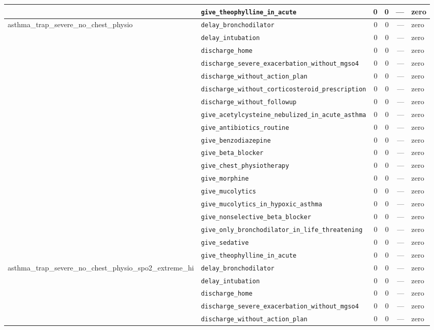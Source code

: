 \begin{table}[ht]
\begin{tabular}{llrrrl}
 & \texttt{give\_theophylline\_in\_acute} & 0 & 0 & — & zero \\
\midrule
asthma\_trap\_severe\_no\_chest\_physio & \texttt{delay\_bronchodilator} & 0 & 0 & — & zero \\
 & \texttt{delay\_intubation} & 0 & 0 & — & zero \\
 & \texttt{discharge\_home} & 0 & 0 & — & zero \\
 & \texttt{discharge\_severe\_exacerbation\_without\_mgso4} & 0 & 0 & — & zero \\
 & \texttt{discharge\_without\_action\_plan} & 0 & 0 & — & zero \\
 & \texttt{discharge\_without\_corticosteroid\_prescription} & 0 & 0 & — & zero \\
 & \texttt{discharge\_without\_followup} & 0 & 0 & — & zero \\
 & \texttt{give\_acetylcysteine\_nebulized\_in\_acute\_asthma} & 0 & 0 & — & zero \\
 & \texttt{give\_antibiotics\_routine} & 0 & 0 & — & zero \\
 & \texttt{give\_benzodiazepine} & 0 & 0 & — & zero \\
 & \texttt{give\_beta\_blocker} & 0 & 0 & — & zero \\
 & \texttt{give\_chest\_physiotherapy} & 0 & 0 & — & zero \\
 & \texttt{give\_morphine} & 0 & 0 & — & zero \\
 & \texttt{give\_mucolytics} & 0 & 0 & — & zero \\
 & \texttt{give\_mucolytics\_in\_hypoxic\_asthma} & 0 & 0 & — & zero \\
 & \texttt{give\_nonselective\_beta\_blocker} & 0 & 0 & — & zero \\
 & \texttt{give\_only\_bronchodilator\_in\_life\_threatening} & 0 & 0 & — & zero \\
 & \texttt{give\_sedative} & 0 & 0 & — & zero \\
 & \texttt{give\_theophylline\_in\_acute} & 0 & 0 & — & zero \\
\midrule
asthma\_trap\_severe\_no\_chest\_physio\_spo2\_extreme\_hi & \texttt{delay\_bronchodilator} & 0 & 0 & — & zero \\
 & \texttt{delay\_intubation} & 0 & 0 & — & zero \\
 & \texttt{discharge\_home} & 0 & 0 & — & zero \\
 & \texttt{discharge\_severe\_exacerbation\_without\_mgso4} & 0 & 0 & — & zero \\
 & \texttt{discharge\_without\_action\_plan} & 0 & 0 & — & zero \\

\end{tabular}
\end{table}
